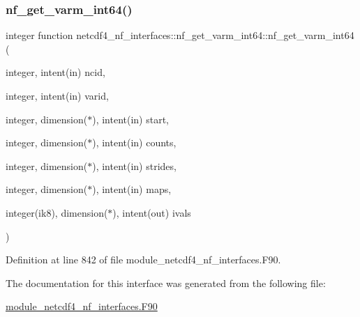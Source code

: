 \subsubsection{\texorpdfstring{nf\+\_\+get\+\_\+varm\+\_\+int64()}{nf\_get\_varm\_int64()}}
{\footnotesize\ttfamily integer function netcdf4\+\_\+nf\+\_\+interfaces\+::nf\+\_\+get\+\_\+varm\+\_\+int64\+::nf\+\_\+get\+\_\+varm\+\_\+int64 (\begin{DoxyParamCaption}\item[{integer, intent(in)}]{ncid,  }\item[{integer, intent(in)}]{varid,  }\item[{integer, dimension($\ast$), intent(in)}]{start,  }\item[{integer, dimension($\ast$), intent(in)}]{counts,  }\item[{integer, dimension($\ast$), intent(in)}]{strides,  }\item[{integer, dimension($\ast$), intent(in)}]{maps,  }\item[{integer(ik8), dimension($\ast$), intent(out)}]{ivals }\end{DoxyParamCaption})}



Definition at line 842 of file module\+\_\+netcdf4\+\_\+nf\+\_\+interfaces.\+F90.



The documentation for this interface was generated from the following file\+:\begin{DoxyCompactItemize}
\item 
\hyperlink{module__netcdf4__nf__interfaces_8F90}{module\+\_\+netcdf4\+\_\+nf\+\_\+interfaces.\+F90}\end{DoxyCompactItemize}
